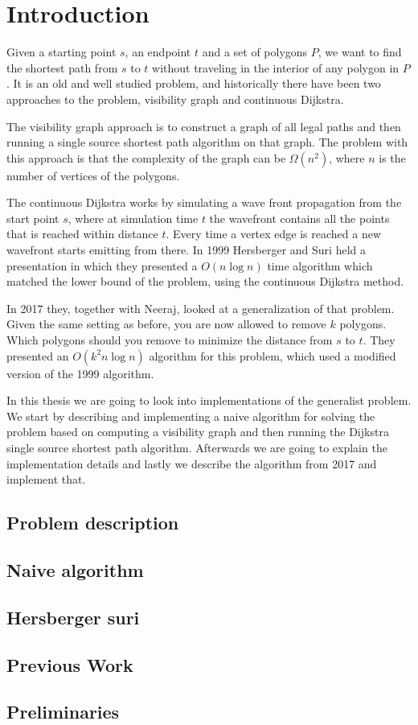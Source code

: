 \chapter{Introduction} Given a starting point $s$, an endpoint $t$ and a set of
polygons $P$, we want to find the shortest path from $s$ to $t$ without
traveling in the interior of any polygon in $P$. It is an old and well studied
problem, and historically there have been two approaches to the problem,
visibility graph and continuous Dijkstra. 

The visibility graph approach is to construct a graph of all legal paths and
then running a single source shortest path algorithm on that graph. The problem
with this approach is that the complexity of the graph can be $\Omega(n^2)$,
where $n$ is the number of vertices of the polygons. 

The continuous Dijkstra works by simulating a wave front propagation from the
start point $s$, where at simulation time $t$ the wavefront contains all the
points that is reached within distance $t$.  Every time a vertex edge is
reached a new wavefront starts emitting from there. In 1999 Hersberger and Suri
held a presentation in which they presented a $O(n\log n)$ time algorithm which
matched the lower bound of the problem, using the continuous Dijkstra method.

In 2017 they, together with Neeraj, looked at a generalization of that problem.
Given the same setting as before, you are now allowed to remove $k$ polygons.
Which polygons should you remove to minimize the distance from $s$ to $t$. They
presented an $O(k^2 n\log n)$ algorithm for this problem, which used a modified
version of the 1999 algorithm.

In this thesis we are going to look into implementations of the generalist
problem. We start by describing and implementing a naive algorithm for solving
the problem based on computing a visibility graph and then running the Dijkstra
single source shortest path algorithm. Afterwards we are going to explain the
implementation details and lastly we describe the algorithm from 2017 and
implement that.
\section{Problem description}

\section{Naive algorithm}
\section{Hersberger suri}
\section{Previous Work}
\section{Preliminaries}
